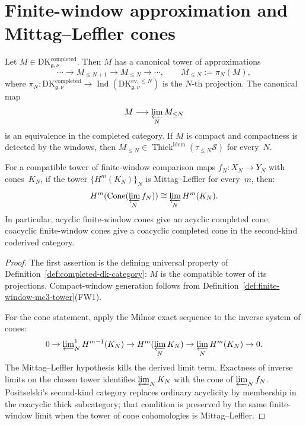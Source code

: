 \section{Finite-window approximation and Mittag--Leffler cones}
\label{sec:compact-approximation}

\begin{proposition}
\label{prop:compact-approximation-exists}
%
%
%
Let $M\in\mathrm{DK}^{\mathrm{completed}}_{\mathfrak g,\nu}$.
Then $M$ has a canonical tower of approximations
\[
 \cdots \longrightarrow M_{\le N+1}
 \longrightarrow M_{\le N}
 \longrightarrow \cdots,
 \qquad
 M_{\le N}:=\pi_N(M),
\]
where
$\pi_N\colon\mathrm{DK}^{\mathrm{completed}}_{\mathfrak g,\nu}\to
\operatorname{Ind}(
\mathrm{DK}^{\mathrm{ev},\le N}_{\mathfrak g,\nu})$
is the $N$-th projection.  The canonical map
\[
 M\longrightarrow \varprojlim_N M_{\le N}
\]
is an equivalence in the completed category.  If $M$ is compact and
compactness is detected by the windows, then
$M_{\le N}\in\operatorname{Thick}^{\mathrm{idem}}(\tau_{\le N}\mathcal S)$
for every~$N$.

For a compatible tower of finite-window comparison maps
$f_N\colon X_N\to Y_N$ with cones~$K_N$, if the tower
$\{H^m(K_N)\}_N$ is Mittag--Leffler for every~$m$, then:
\[
H^m(\operatorname{Cone}(\varprojlim_N f_N))
\cong
\varprojlim_N H^m(K_N).
\]
In particular, acyclic finite-window cones give an acyclic completed
cone; coacyclic finite-window cones give a coacyclic completed cone in
the second-kind coderived category.
\end{proposition}

\begin{proof}
The first assertion is the defining universal property of
Definition~\ref{def:completed-dk-category}: $M$ is the compatible
tower of its projections.  Compact-window generation follows from
Definition~\ref{def:finite-window-mc3-tower}(FW1).

For the cone statement, apply the Milnor exact sequence to the inverse
system of cones:
\[
0\to
\varprojlim\nolimits_N^1H^{m-1}(K_N)
\to
H^m(\varprojlim_NK_N)
\to
\varprojlim_NH^m(K_N)
\to0.
\]
The Mittag--Leffler hypothesis kills the derived limit term.  Exactness
of inverse limits on the chosen tower identifies
$\varprojlim_NK_N$ with the cone of $\varprojlim_N f_N$.  Positselski's
second-kind category replaces ordinary acyclicity by membership in
the coacyclic thick subcategory; that condition is preserved by the
same finite-window limit when the tower of cone cohomologies is
Mittag--Leffler.
\end{proof}


